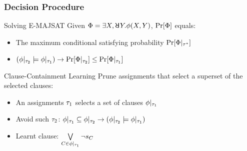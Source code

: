 \begin{frame}
    \frametitle{Decision Procedure}
    \begin{block}{Solving E-MAJSAT}
        Given $\Qf=\exists X,\random{} Y.\pf(X,Y)$, $\Pr[\Phi]$ equals:
        \pause
        \begin{itemize}
            \item The maximum conditional satisfying probability $\Pr[\Phi|_{\tau^*}]$
                  \pause
            \item $(\phi|_{\tau_2}\models\phi|_{\tau_1})\rightarrow\Pr[\Phi|_{\tau_2}]\leq\Pr[\Phi|_{\tau_1}]$
                  \pause
        \end{itemize}
    \end{block}
    \begin{block}{Clause-Containment Learning}
        Prune assignments that select a superset of the selected clauses:
        \pause
        \begin{itemize}
            \item An assignments $\tau_1$ selects a set of clauses $\phi|_{\tau_1}$
                  \pause
            \item Avoid such $\tau_2$: $\phi|_{\tau_1}\subseteq\phi|_{\tau_2}\rightarrow(\phi|_{\tau_2}\models\phi|_{\tau_1})$
                  \pause
            \item Learnt clause: $\bigvee\limits_{C\in\phi|_{\tau_1}}\lnot s_{C}$
        \end{itemize}
    \end{block}
\end{frame}

